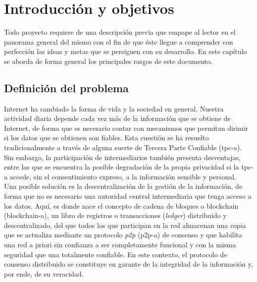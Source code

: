 \documentclass[12pt,a4paper, twoside]{report}
\begin{document}
	\setlength{\headwidth}{17.5cm}
	\renewcommand{\headrulewidth}{1.3pt}
	\setlength{\headsep}{1.1cm}
	
	\chapter{Introducción y objetivos} \label{introductionChapter}
		
	
	Todo proyecto requiere de una descripción previa que empape al lector en el panorama general del mismo con el fin de que éste llegue a comprender con perfección las ideas y metas que se persiguen con su desarrollo. En este capítulo se aborda de forma general los principales rasgos de este documento.
		
	\section{Definición del problema}
		
	Internet ha cambiado la forma de vida y la sociedad en general. Nuestra actividad diaria depende cada vez más de la información que se obtiene de Internet, de forma que es necesario contar con mecanismos que permitan dirimir si los datos que se obtienen son fiables. Esta cuestión se ha resuelto tradicionalmente a través de alguna suerte de Tercera Parte Confiable (\gls{tpc-a}). Sin embargo, la participación de intermediarios también presenta desventajas, entre las que se encuentra la posible degradación de la propia privacidad si la \gls{tpc-a} accede, sin el consentimiento expreso, a la información sensible y personal. \\
	
	Una posible solución es la descentralización de la gestión de la información, de forma que no es necesario una autoridad central intermediaria que tenga acceso a los datos. Aquí, es donde nace el concepto de cadena de bloques o \Gls{blockchain} (\gls{blockchain-a}), un libro de registros o transacciones (\textit{ledger}) distribuido y descentralizado, del que todos los que participan en la red almacenan una copia que se actualiza mediante un protocolo \textit{\gls{p2p}} (\gls{p2p-a}) de consenso y que habilita una red a priori sin confianza a ser completamente funcional y con la misma seguridad que una totalmente confiable. En este contexto, el protocolo de consenso distribuido se constituye en garante de la integridad de la información y, por ende, de su veracidad. \\
\end{document}

